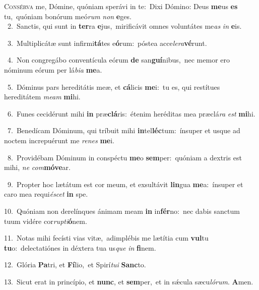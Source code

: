 \lettrine{\initial\textcolor{\initialcolor}{C}}{onsérva} me, Dómine, quóniam sperávi in te:~\dagger Dixi Dómino: Deus \textbf{me}\-us \textbf{es} tu,~\star quóniam bonórum meó\textit{rum} \textit{non} \textbf{e}\-ges.\\
{\numbfont\textcolor{\numbcolor}{~2.}}~Sanctis, qui sunt in \textbf{ter}\-ra \textbf{e}\-jus,~\star mirificávit omnes voluntátes me\textit{as} \textit{in} \textbf{e}\-is.\par
{\numbfont\textcolor{\numbcolor}{~3.}}~Multiplicátæ sunt infirmi\-\textbf{tá}\-tes e\-\textbf{ó}\-rum:~\star póstea acce\-\textit{le}\-\textit{ra}\textbf{vé}runt.\par
{\numbfont\textcolor{\numbcolor}{~4.}}~Non congregábo conventícula eórum \textbf{de} san\-\textbf{guí}\-nibus,~\star nec memor ero nóminum eórum per lá\-\textit{bi}\-\textit{a} \textbf{me}\-a.\par
{\numbfont\textcolor{\numbcolor}{~5.}}~Dóminus pars hereditátis meæ, et \textbf{cá}\-licis \textbf{me}\-i:~\star tu es, qui restítues hereditátem \textit{me}\-\textit{am} \textbf{mi}\-hi.\par
{\numbfont\textcolor{\numbcolor}{~6.}}~Funes cecidérunt mihi \textbf{in} præ\-\textbf{clá}\-ris:~\star étenim heréditas mea præclá\textit{ra} \textit{est} \textbf{mi}\-hi.\par
{\numbfont\textcolor{\numbcolor}{~7.}}~Benedícam Dóminum, qui tríbuit mihi \textbf{in}\-tel\-\textbf{léc}\-tum:~\star ínsuper et usque ad noctem increpuérunt me \textit{re}\-\textit{nes} \textbf{me}\-i.\par
{\numbfont\textcolor{\numbcolor}{~8.}}~Providébam Dóminum in conspéctu \textbf{me}\-o \textbf{sem}\-per:~\star quóniam a dextris est mihi, \textit{ne} \textit{com}\-\textbf{mó}\textbf{ve}ar.\par
{\numbfont\textcolor{\numbcolor}{~9.}}~Propter hoc lætátum est cor meum, et exsultávit \textbf{lin}\-gua \textbf{me}\-a:~\star ínsuper et caro mea requi\-\textit{é}\-\textit{scet} \textbf{in} spe.\par
{\numbfont\textcolor{\numbcolor}{10.}}~Quóniam non derelínques ánimam meam \textbf{in} in\-\textbf{fér}\-no:~\star nec dabis sanctum tuum vidére cor\-\textit{rup}\-\textit{ti}\textbf{ó}nem.\par
{\numbfont\textcolor{\numbcolor}{11.}}~Notas mihi fecísti vias vitæ,~\dagger adimplébis me lætítia cum \textbf{vul}\-tu \textbf{tu}\-o:~\star delectatiónes in déxtera tua us\textit{que} \textit{in} \textbf{fi}\-nem.\par
{\numbfont\textcolor{\numbcolor}{12.}}~Glória \textbf{Pa}\-tri, et \textbf{Fí}\-lio,~\star et Spirí\-\textit{tu}\-\textit{i} \textbf{Sanc}\-to.\par
{\numbfont\textcolor{\numbcolor}{13.}}~Sicut erat in princípio, et \textbf{nunc}\-, et \textbf{sem}\-per,~\star et in sǽcula sæcu\-\textit{ló}\-\textit{rum}. \textbf{A}\-men.\par

